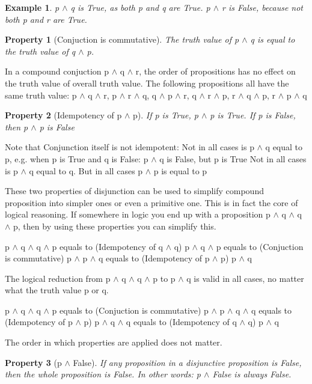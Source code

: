 \documentclass[10pt,a4paper,draft,titlepage,onecolumn]{book}
\newtheorem{example}{Example}[section]
\newtheorem{property}{Property}[section]
\begin{document}
\begin{example}
p $\wedge$ q is True, as both p and q are True.
p $\wedge$ r is False, because not both p and r are True.
\end{example}

\begin{property}[Conjuction is commutative] The truth value of p $\wedge$  q is equal to the truth value of q $\wedge$ p.
\end{property}
In a compound conjuction p $\wedge$ q $\wedge$ r, the order of propositions has no effect on the truth value of overall truth value. The following propositions all have the same truth value:
p $\wedge$ q $\wedge$ r,
p $\wedge$ r $\wedge$ q,
q $\wedge$ p $\wedge$ r,
q $\wedge$ r $\wedge$ p,
r $\wedge$ q $\wedge$ p,
r $\wedge$ p $\wedge$ q
\begin{property}[Idempotency of p $\wedge$  p] If p is True, p $\wedge$ p is True. If p is False, then p $\wedge$ p is False
\end{property}
Note that Conjunction itself is not idempotent: 
Not in all cases is  p $\wedge$ q equal to p, e.g. when p is True and q is False: p $\wedge$ q is False, but p is True
Not in all cases is  p $\wedge$ q equal to q. 
But in all cases   p $\wedge$ p is equal to p 

These two properties of disjunction can be used to simplify compound proposition into simpler ones or even a primitive one. This is in fact the core of logical reasoning. 
If somewhere in logic you end up with a proposition p $\wedge$ q $\wedge$ q $\wedge$ p, then by using these properties you can simplify this.

p $\wedge$ q $\wedge$ q $\wedge$ p
equals to (Idempotency of q $\wedge$ q) 
p $\wedge$ q $\wedge$ p
equals to  (Conjuction is commutative)
p $\wedge$ p $\wedge$ q
equals to (Idempotency of p $\wedge$ p)
p $\wedge$ q

The logical reduction from  p $\wedge$ q $\wedge$ q $\wedge$ p to p $\wedge$ q is valid in all cases, no matter what the truth value p or q.				

p $\wedge$ q $\wedge$ q $\wedge$ p
equals to (Conjuction is commutative)
p $\wedge$ p $\wedge$ q $\wedge$ q
equals to  (Idempotency of p $\wedge$ p)
p $\wedge$ q $\wedge$ q
equals to (Idempotency of q $\wedge$ q)
p $\wedge$ q

The order in which properties are applied does not matter. 

\begin{property}[p $\wedge$  False]  If any proposition in a disjunctive proposition is False, then the whole proposition is False. In other words: p $\wedge$  False is always False.
\end{property}
\end{document}
